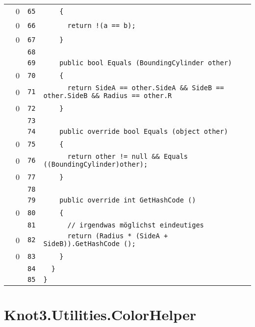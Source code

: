 \documentclass[a4paper,10pt]{article}
\begin{document}
\begin{longtable}[l]{lrrl}
\cellcolor{red} & 0 & \verb~65~ & \verb~    {~\\
\cellcolor{red} & 0 & \verb~66~ & \verb~      return !(a == b);~\\
\cellcolor{red} & 0 & \verb~67~ & \verb~    }~\\
\cellcolor{gray} &  & \verb~68~ & \verb~~\\
\cellcolor{gray} &  & \verb~69~ & \verb~    public bool Equals (BoundingCylinder other)~\\
\cellcolor{red} & 0 & \verb~70~ & \verb~    {~\\
\cellcolor{red} & 0 & \verb~71~ & \verb~      return SideA == other.SideA && SideB == other.SideB && Radius == other.R~\\
\cellcolor{red} & 0 & \verb~72~ & \verb~    }~\\
\cellcolor{gray} &  & \verb~73~ & \verb~~\\
\cellcolor{gray} &  & \verb~74~ & \verb~    public override bool Equals (object other)~\\
\cellcolor{red} & 0 & \verb~75~ & \verb~    {~\\
\cellcolor{red} & 0 & \verb~76~ & \verb~      return other != null && Equals ((BoundingCylinder)other);~\\
\cellcolor{red} & 0 & \verb~77~ & \verb~    }~\\
\cellcolor{gray} &  & \verb~78~ & \verb~~\\
\cellcolor{gray} &  & \verb~79~ & \verb~    public override int GetHashCode ()~\\
\cellcolor{red} & 0 & \verb~80~ & \verb~    {~\\
\cellcolor{gray} &  & \verb~81~ & \verb~      // irgendwas möglichst eindeutiges~\\
\cellcolor{red} & 0 & \verb~82~ & \verb~      return (Radius * (SideA + SideB)).GetHashCode ();~\\
\cellcolor{red} & 0 & \verb~83~ & \verb~    }~\\
\cellcolor{gray} &  & \verb~84~ & \verb~  }~\\
\cellcolor{gray} &  & \verb~85~ & \verb~}~\\
\end{longtable}
\newpage
\section{Knot3.Utilities.ColorHelper}
\end{document}

